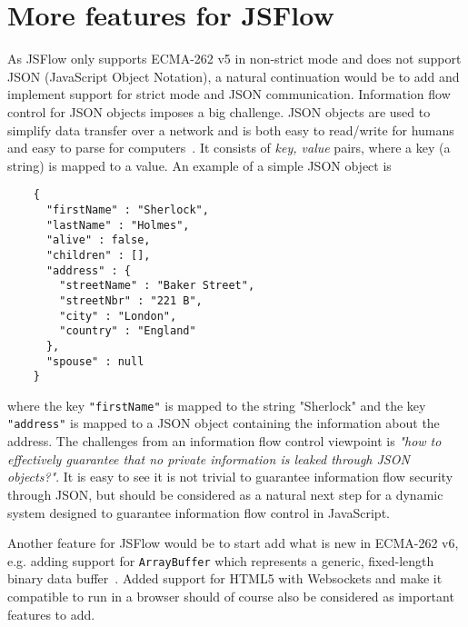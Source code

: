 \section{More features for JSFlow}
As JSFlow only supports ECMA-262 v5 in non-strict mode and does not support JSON (JavaScript Object Notation), a natural continuation would be to add and implement support for strict mode and JSON communication. Information flow control for JSON objects imposes a big challenge. JSON objects are used to simplify data transfer over a network and is both easy to read/write for humans and easy to parse for computers~\cite{json}. It consists of \emph{key, value} pairs, where a key (a string) is mapped to a value. An example of a simple JSON object is
\begin{verbatim}
    {
      "firstName" : "Sherlock",
      "lastName" : "Holmes",
      "alive" : false,
      "children" : [],
      "address" : {
        "streetName" : "Baker Street",
        "streetNbr" : "221 B",
        "city" : "London",
        "country" : "England"
      },
      "spouse" : null
    }
\end{verbatim}
where the key {\tt "firstName"} is mapped to the string "Sherlock" and the key {\tt "address"} is mapped to a JSON object containing the information about the address. The challenges from an information flow control viewpoint is \emph{"how to effectively guarantee that no private information is leaked through JSON objects?"}. It is easy to see it is not trivial to guarantee information flow security through JSON, but should be considered as a natural next step for a dynamic system designed to guarantee information flow control in JavaScript.

Another feature for JSFlow would be to start add what is new in ECMA-262 v6, e.g. adding support for {\tt ArrayBuffer} which represents a generic, fixed-length binary data buffer~\cite{js_arraybuffer}. Added support for HTML5 with Websockets and make it compatible to run in a browser should of course also be considered as important features to add.

